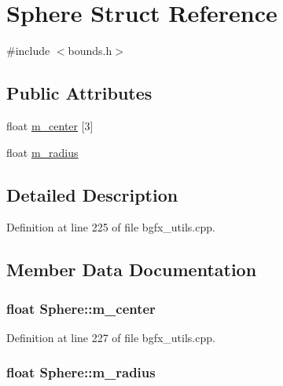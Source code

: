 \hypertarget{struct_sphere}{\section{Sphere Struct Reference}
\label{struct_sphere}
}


{\ttfamily \#include $<$bounds.\+h$>$}

\subsection*{Public Attributes}
\begin{DoxyCompactItemize}
\item 
float \hyperlink{struct_sphere_abb5702ca8a1b205b4057c5288aac844f}{m\+\_\+center} \mbox{[}3\mbox{]}
\item 
float \hyperlink{struct_sphere_a1faee6c9b6e62abf0d35cc87a1894b61}{m\+\_\+radius}
\end{DoxyCompactItemize}


\subsection{Detailed Description}


Definition at line 225 of file bgfx\+\_\+utils.\+cpp.



\subsection{Member Data Documentation}
\hypertarget{struct_sphere_abb5702ca8a1b205b4057c5288aac844f}{
\subsubsection[{m\+\_\+center}]{\setlength{\rightskip}{0pt plus 5cm}float Sphere\+::m\+\_\+center}}\label{struct_sphere_abb5702ca8a1b205b4057c5288aac844f}


Definition at line 227 of file bgfx\+\_\+utils.\+cpp.

\hypertarget{struct_sphere_a1faee6c9b6e62abf0d35cc87a1894b61}{
\subsubsection[{m\+\_\+radius}]{\setlength{\rightskip}{0pt plus 5cm}float Sphere\+::m\+\_\+radius}}\label{struct_sphere_a1faee6c9b6e62abf0d35cc87a1894b61}


